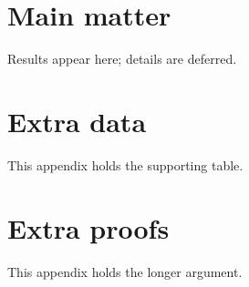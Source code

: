 \documentclass{article}
\begin{document}
\section{Main matter}
Results appear here; details are deferred.
\begin{appendices}
\section{Extra data}
This appendix holds the supporting table.
\section{Extra proofs}
This appendix holds the longer argument.
\end{appendices}
\end{document}
